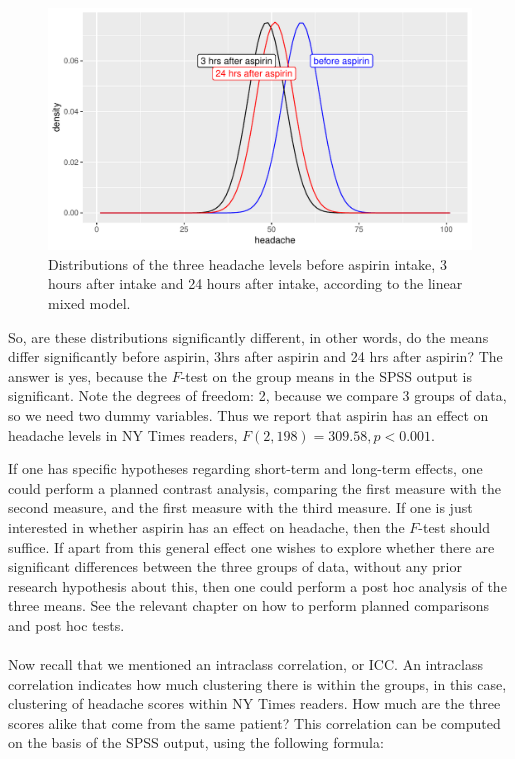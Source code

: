 \documentclass[]{report}\usepackage[]{graphicx}\usepackage[]{color}
\makeatletter
\def\maxwidth{ %
  \ifdim\Gin@nat@width>\linewidth
    \linewidth
  \else
    \Gin@nat@width
  \fi
}
\newenvironment{knitrout}{}{} %
\makeatother
\begin{document}
\begin{knitrout}
\color{fgcolor}\begin{figure}

{\centering \includegraphics[width=\maxwidth]{figure/analysispremidpost3-1} 

}

\caption[Distributions of the three headache levels before aspirin intake, 3 hours after intake and 24 hours after intake, according to the linear mixed model]{Distributions of the three headache levels before aspirin intake, 3 hours after intake and 24 hours after intake, according to the linear mixed model.}\label{fig:analysispremidpost3}
\end{figure}


\end{knitrout}



So, are these distributions significantly different, in other words, do the means differ significantly before aspirin, 3hrs after aspirin and 24 hrs after aspirin? The answer is yes, because the $F$-test on the group means in the SPSS output is significant. Note the degrees of freedom: 2, because we compare 3 groups of data, so we need two dummy variables. Thus we report that aspirin has an effect on headache levels in NY Times readers, $F(2, 198)=309.58, p<0.001$.

If one has specific hypotheses regarding short-term and long-term effects, one could perform a planned contrast analysis, comparing the first measure with the second measure, and the first measure with the third measure. If one is just interested in whether aspirin has an effect on headache, then the $F$-test should suffice. If apart from this general effect one wishes to explore whether there are significant differences between the three groups of data, without any prior research hypothesis about this, then one could perform a post hoc analysis of the three means. See the relevant chapter on how to perform planned comparisons and post hoc tests.
\\
\\
Now recall that we mentioned an intraclass correlation, or ICC. An intraclass correlation indicates how much clustering there is within the groups, in this case, clustering of headache scores within NY Times readers. How much are the three scores alike that come from the same patient? This correlation can be computed on the basis of the SPSS output, using the following formula:
\end{document}
